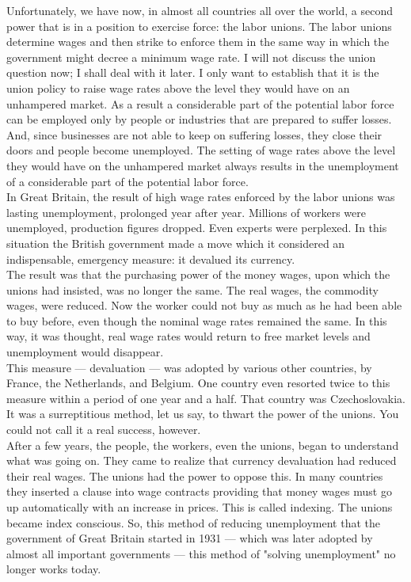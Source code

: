 \documentclass[a4paper]{article}
\begin{document}
Unfortunately, we have now, in almost all countries all over the world, a 
second power that is in a position to exercise force: the labor unions. The 
labor unions determine wages and then strike to enforce them in the same way in
which the government might decree a minimum wage rate. I will not discuss the 
union question now; I shall deal with it later. I only want to establish that 
it is the union policy to raise wage rates above the level they would have on 
an unhampered market. As a result a considerable part of the potential labor 
force can be employed only by people or industries that are prepared to suffer 
losses. And, since businesses are not able to keep on suffering losses, they 
close their doors and people become unemployed. The setting of wage rates above
the level they would have on the unhampered market always results in the 
unemployment of a considerable part of the potential labor force.\\

In Great Britain, the result of high wage rates enforced by the labor unions 
was lasting unemployment, prolonged year after year. Millions of workers were 
unemployed, production figures dropped. Even experts were perplexed. In this 
situation the British government made a move which it considered an 
indispensable, emergency measure: it devalued its currency.\\

The result was that the purchasing power of the money wages, upon which the 
unions had insisted, was no longer the same. The real wages, the commodity 
wages, were reduced. Now the worker could not buy as much as he had been able 
to buy before, even though the nominal wage rates remained the same. In this 
way, it was thought, real wage rates would return to free market levels and 
unemployment would disappear.\\

This measure — devaluation — was adopted by various other countries, by France,
the Netherlands, and Belgium. One country even resorted twice to this measure 
within a period of one year and a half. That country was Czechoslovakia. It was
a surreptitious method, let us say, to thwart the power of the unions. You 
could not call it a real success, however.\\

After a few years, the people, the workers, even the unions, began to 
understand what was going on. They came to realize that currency devaluation 
had reduced their real wages. The unions had the power to oppose this. In many 
countries they inserted a clause into wage contracts providing that money wages
must go up automatically with an increase in prices. This is called indexing. 
The unions became index conscious. So, this method of reducing unemployment 
that the government of Great Britain started in 1931 — which was later adopted 
by almost all important governments — this method of "solving unemployment" no 
longer works today.\\
\end{document}
